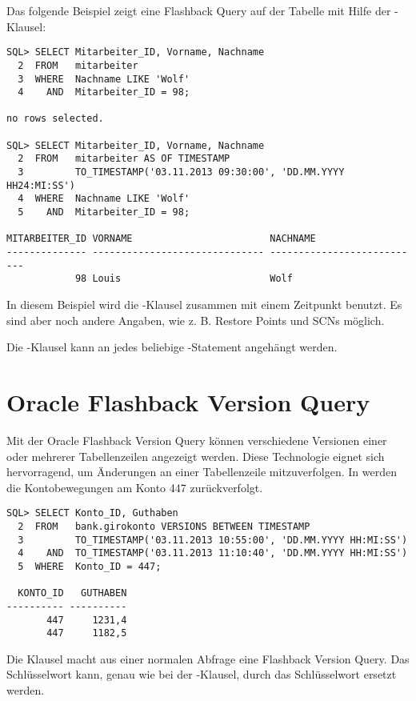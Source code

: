       Das folgende Beispiel zeigt eine Flashback Query auf der Tabelle  mit Hilfe der -Klausel:
      \begin{lstlisting}[caption={Flashback Query mit AS OF TIMESTAMP},label=admin1700,language=oracle_sql]
SQL> SELECT Mitarbeiter_ID, Vorname, Nachname
  2  FROM   mitarbeiter
  3  WHERE  Nachname LIKE 'Wolf'
  4    AND  Mitarbeiter_ID = 98;

no rows selected.

SQL> SELECT Mitarbeiter_ID, Vorname, Nachname
  2  FROM   mitarbeiter AS OF TIMESTAMP
  3         TO_TIMESTAMP('03.11.2013 09:30:00', 'DD.MM.YYYY HH24:MI:SS')
  4  WHERE  Nachname LIKE 'Wolf'
  5    AND  Mitarbeiter_ID = 98;

MITARBEITER_ID VORNAME                        NACHNAME
-------------- ------------------------------ ---------------------------
            98 Louis                          Wolf
      \end{lstlisting}
      In diesem Beispiel wird die -Klausel zusammen mit einem Zeitpunkt benutzt. Es sind aber noch andere Angaben, wie z. B. Restore Points und SCNs möglich.
      \begin{merke}
        Die -Klausel kann an jedes beliebige -Statement angehängt werden.
      \end{merke}
      \begin{literaturinternet}
        \item \cite{ADFNS01003}
      \end{literaturinternet}
    \section{Oracle Flashback Version Query}
      Mit der Oracle Flashback Version Query können verschiedene Versionen einer oder mehrerer Tabellenzeilen angezeigt werden. Diese Technologie eignet sich hervorragend, um Änderungen an einer Tabellenzeile mitzuverfolgen. In  werden die Kontobewegungen am Konto 447 zurückverfolgt.
      \begin{lstlisting}[caption={Verschiedene Versionen einer Zeile mit Flashback Version Query},label=admin1701,language=oracle_sql]
SQL> SELECT Konto_ID, Guthaben
  2  FROM   bank.girokonto VERSIONS BETWEEN TIMESTAMP
  3         TO_TIMESTAMP('03.11.2013 10:55:00', 'DD.MM.YYYY HH:MI:SS')
  4    AND  TO_TIMESTAMP('03.11.2013 11:10:40', 'DD.MM.YYYY HH:MI:SS')
  5  WHERE  Konto_ID = 447;

  KONTO_ID   GUTHABEN
---------- ----------
       447     1231,4
       447     1182,5
      \end{lstlisting}
      Die Klausel  macht aus einer normalen Abfrage eine Flashback Version Query. Das Schlüsselwort  kann, genau wie bei der -Klausel, durch das Schlüsselwort  ersetzt werden.

